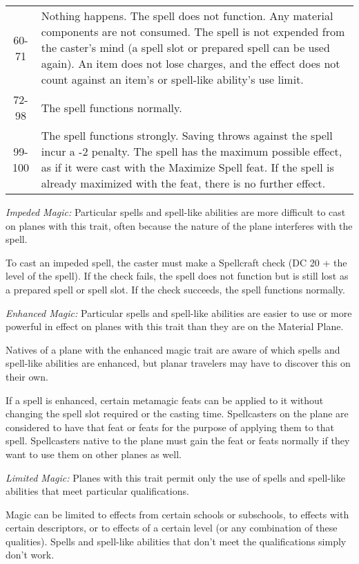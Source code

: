 \begin{table}[htb]
\begin{tabular}{c p{14cm}}
60-71 & Nothing happens. The spell does not function. Any material components are not consumed. The spell is not expended from the caster's mind (a spell slot or prepared spell can be used again). An item does not lose charges, and the effect does not count against an item's or spell-like ability's use limit.\\
72-98 & The spell functions normally.\\
99-100 & The spell functions strongly. Saving throws against the spell incur a -2 penalty. The spell has the maximum possible effect, as if it were cast with the Maximize Spell feat. If the spell is already maximized with the feat, there is no further effect.\\
\end{tabular}
\end{table}

\textit{Impeded Magic:} Particular spells and spell-like abilities are more difficult 
to cast on planes with this trait, often because the nature of the plane interferes 
with the spell.

To cast an impeded spell, the caster must make a Spellcraft check (DC 20 + the 
level of the spell). If the check fails, the spell does not function but is still 
lost as a prepared spell or spell slot. If the check succeeds, the spell functions 
normally.

\textit{Enhanced Magic:} Particular spells and spell-like abilities are easier 
to use or more powerful in effect on planes with this trait than they are on the 
Material Plane.

Natives of a plane with the enhanced magic trait are aware of which spells and 
spell-like abilities are enhanced, but planar travelers may have to discover this 
on their own.

If a spell is enhanced, certain metamagic feats can be applied to it without changing 
the spell slot required or the casting time. Spellcasters on the plane are considered 
to have that feat or feats for the purpose of applying them to that spell. Spellcasters 
native to the plane must gain the feat or feats normally if they want to use them 
on other planes as well.

\textit{Limited Magic:} Planes with this trait permit only the use of spells and 
spell-like abilities that meet particular qualifications.

Magic can be limited to effects from certain schools or subschools, to effects 
with certain descriptors, or to effects of a certain level (or any combination 
of these qualities). Spells and spell-like abilities that don't meet the qualifications 
simply don't work.

